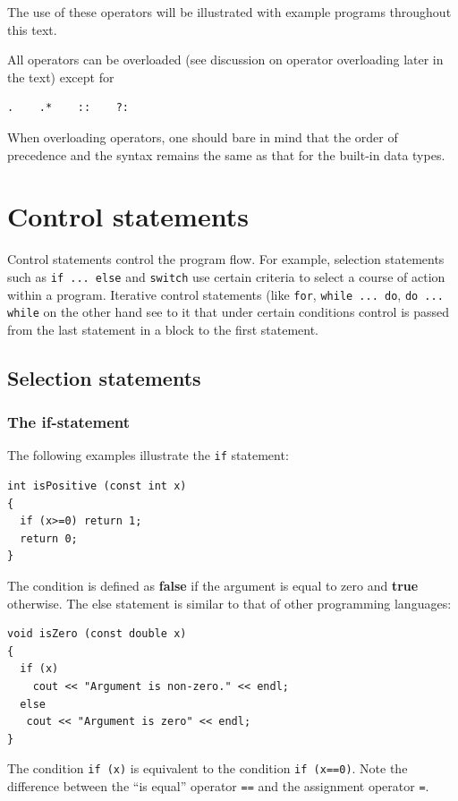 The use of these operators will be illustrated with example programs
throughout this text.

All operators can be overloaded  (see
discussion on operator overloading later in the text) except for
{\small \begin{verbatim}
.    .*    ::    ?:
\end{verbatim}}
\noindent
When overloading operators, one should bare in mind that the order of precedence
and the syntax remains the same as that for the built-in data types.

\clearpage

\section{Control statements}
Control statements control the program flow. For example,
selection statements such as \verb+if ... else+  and
\verb+switch+ use certain criteria to select a course
of action within a program. Iterative control statements (like
\verb+for+, \verb+while ... do+, \verb+do ... while+ on
the other hand see to it that under certain conditions control
is passed from the last statement in a block to the first statement.

\subsection{Selection statements}

\subsubsection{The if-statement}

The following examples illustrate the \verb+if+ statement:
{\small\begin{verbatim}
int isPositive (const int x)
{
  if (x>=0) return 1;
  return 0;
}
\end{verbatim}}
\noindent
The condition is defined as {\bf false} if the argument is equal to zero
and {\bf true} otherwise. The else statement is similar to that of other
programming languages:
{\small\begin{verbatim}
void isZero (const double x)
{
  if (x)
    cout << "Argument is non-zero." << endl;
  else
   cout << "Argument is zero" << endl;
}
\end{verbatim}}
\noindent
The condition \verb+if (x)+ is equivalent to the condition \verb+if (x==0)+.
Note the difference between the ``is equal'' operator \verb+==+ and the
assignment operator \verb+=+.

